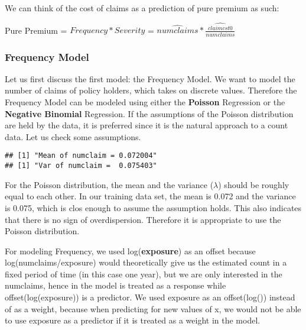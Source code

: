 \documentclass[a4paper]{article}\usepackage[]{graphicx}\usepackage[]{color}
\makeatletter
\newenvironment{kframe}{%
 \def\at@end@of@kframe{}%
 \ifinner\ifhmode%
  \def\at@end@of@kframe{\end{minipage}}%
  \begin{minipage}{\columnwidth}%
 \fi\fi%
 \def\FrameCommand##1{\hskip\@totalleftmargin \hskip-\fboxsep
 \colorbox{shadecolor}{##1}\hskip-\fboxsep
     \hskip-\linewidth \hskip-\@totalleftmargin \hskip\columnwidth}%
 \MakeFramed {\advance\hsize-\width
   \@totalleftmargin\z@ \linewidth\hsize
   \@setminipage}}%
 {\par\unskip\endMakeFramed%
 \at@end@of@kframe}
\newenvironment{knitrout}{}{} %
\makeatother
\begin{document}
We can think of the cost of claims as a prediction of pure premium as such:

\begin{center}
Pure Premium = $Frequency * Severity$ = $\hat{numclaims} * \hat{\frac{claimcst0}{numclaims}}$
\end{center}

\subsubsection*{Frequency Model}

Let us first discuss the first model: the Frequency Model. We want to model the number of claims of policy holders, which takes on discrete values. Therefore the Frequency Model can be modeled using either the \textbf{Poisson} Regression or the \textbf{Negative Binomial} Regression. If the assumptions of the Poisson distribution are held by the data, it is preferred since it is the natural approach to a count data. Let us check some assumptions.

\begin{knitrout}
\color{fgcolor}\begin{kframe}
\begin{verbatim}
## [1] "Mean of numclaim = 0.072004"
## [1] "Var of numclaim =  0.075403"
\end{verbatim}
\end{kframe}
\end{knitrout}

For the Poisson distribution, the mean and the variance ($\lambda$) should be roughly equal to each other. In our training data set, the mean is 0.072 and the variance is 0.075, which is clos enough to assume the assumption holds. This also indicates that there is no sign of overdispersion. Therefore it is appropriate to use the Poisson distribution.

For modeling Frequency, we used log(\textbf{exposure}) as an offset because log(numclaims/exposure) would theoretically give us the estimated count in a fixed period of time (in this case one year), but we are only interested in the numclaims, hence in the model is treated as a response while offset(log(exposure)) is a predictor. We used exposure as an offset(log()) instead of as a weight, because when predicting for new values of x, we would not be able to use exposure as a predictor if it is treated as a weight in the model.
\\
\end{document}
